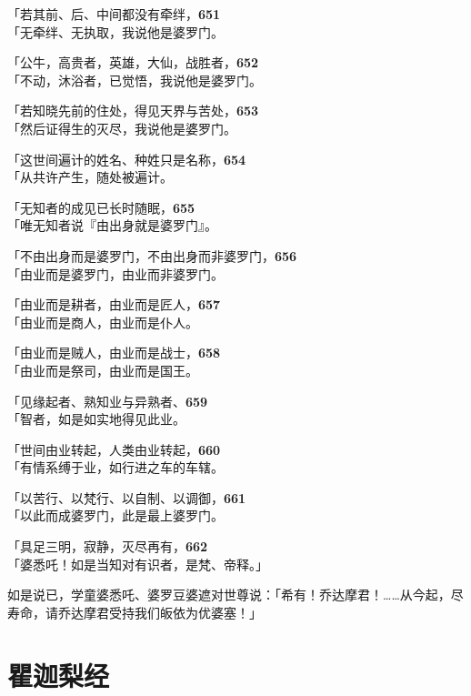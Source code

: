 「若其前、后、中间都没有牵绊，\hfill{\grayfootnotesize \textbf{651}} \\
「无牵绊、无执取，我说他是婆罗门。


「公牛，高贵者，英雄，大仙，战胜者，\hfill{\grayfootnotesize \textbf{652}} \\
「不动，沐浴者，已觉悟，我说他是婆罗门。


「若知晓先前的住处，得见天界与苦处，\hfill{\grayfootnotesize \textbf{653}} \\
「然后证得生的灭尽，我说他是婆罗门。


「这世间遍计的姓名、种姓只是名称，\hfill{\grayfootnotesize \textbf{654}} \\
「从共许产生，随处被遍计。


「无知者的成见已长时随眠，\hfill{\grayfootnotesize \textbf{655}} \\
「唯无知者说『由出身就是婆罗门』。


「不由出身而是婆罗门，不由出身而非婆罗门，\hfill{\grayfootnotesize \textbf{656}} \\
「由业而是婆罗门，由业而非婆罗门。


「由业而是耕者，由业而是匠人，\hfill{\grayfootnotesize \textbf{657}} \\
「由业而是商人，由业而是仆人。


「由业而是贼人，由业而是战士，\hfill{\grayfootnotesize \textbf{658}} \\
「由业而是祭司，由业而是国王。

「见缘起者、熟知业与异熟者、\hfill{\grayfootnotesize \textbf{659}} \\
「智者，如是如实地得见此业。


「世间由业转起，人类由业转起，\hfill{\grayfootnotesize \textbf{660}} \\
「有情系缚于业，如行进之车的车辖。


「以苦行、以梵行、以自制、以调御，\hfill{\grayfootnotesize \textbf{661}} \\
「以此而成婆罗门，此是最上婆罗门。


「具足三明，寂静，灭尽再有，\hfill{\grayfootnotesize \textbf{662}} \\
「婆悉吒！如是当知对有识者，是梵、帝释。」


如是说已，学童婆悉吒、婆罗豆婆遮对世尊说：「希有！乔达摩君！……从今起，尽寿命，请乔达摩君受持我们皈依为优婆塞！」

\section{瞿迦梨经}

